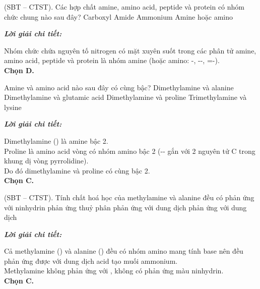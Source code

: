 \documentclass[11pt,a4paper]{article}
\def\loigiai#1{
\par\begingroup\color{blue!80!black}\small
\noindent\textbf{\textit{Lời giải chi tiết:}}\par
#1\par\endgroup}
\begin{document}
\begin{ex}
(SBT -- CTST). Các hợp chất amine, amino acid, peptide và protein có nhóm chức chung nào sau đây?
\choice
{Carboxyl}
{Amide}
{Ammonium}
{\True Amine hoặc amino}
\loigiai{
Nhóm chức chứa nguyên tố nitrogen có mặt xuyên suốt trong các phân tử amine, amino acid, peptide và protein là nhóm amine (hoặc amino: -\ce{NH2}, -\ce{NH}-, =\ce{N}-).\\
\textbf{Chọn D.}}
\end{ex}

\begin{ex}
Amine và amino acid nào sau đây có cùng bậc?
\choice
{Dimethylamine và alanine}
{Dimethylamine và glutamic acid}
{\True Dimethylamine và proline}
{Trimethylamine và lysine}
\loigiai{
Dimethylamine () là amine bậc 2.\\
Proline là amino acid vòng có nhóm amino bậc 2 (-\ce{NH}- gắn với 2 nguyên tử C trong khung dị vòng pyrrolidine).\\
Do đó dimethylamine và proline có cùng bậc 2.\\
\textbf{Chọn C.}}
\end{ex}

\begin{ex}
(SBT -- CTST). Tính chất hoá học của methylamine và alanine đều có
\choice
{phản ứng với ninhydrin}
{phản ứng thuỷ phân}
{\True phản ứng với dung dịch }
{phản ứng với dung dịch }
\loigiai{
Cả methylamine () và alanine (\ce{CH3CH(NH2)COOH}) đều có nhóm amino mang tính base nên đều phản ứng được với dung dịch acid \ce{HCl} tạo muối ammonium.\\
Methylamine không phản ứng với \ce{NaOH}, không có phản ứng màu ninhydrin.\\
\textbf{Chọn C.}}
\end{ex}
\end{document}
